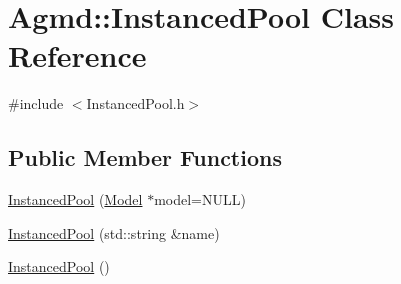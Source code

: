 \hypertarget{class_agmd_1_1_instanced_pool}{\section{Agmd\+:\+:Instanced\+Pool Class Reference}
\label{class_agmd_1_1_instanced_pool}
}


{\ttfamily \#include $<$Instanced\+Pool.\+h$>$}

\subsection*{Public Member Functions}
\begin{DoxyCompactItemize}
\item 
\hyperlink{class_agmd_1_1_instanced_pool_ad02fb6d8b8dc4d13b1373adac7a131ff}{Instanced\+Pool} (\hyperlink{class_agmd_1_1_model}{Model} $\ast$model=N\+U\+L\+L)
\item 
\hyperlink{class_agmd_1_1_instanced_pool_a261a3f816b953c57e7e2c1b6ee3380b8}{Instanced\+Pool} (std\+::string \&name)
\item 
\hyperlink{class_agmd_1_1_instanced_pool_ab44a4a69da126c62b9028c492f60c3f4}{Instanced\+Pool} ()
\end{DoxyCompactItemize}


